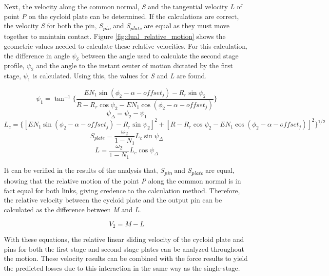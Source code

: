 Next, the velocity along the common normal, \textit{S} and the tangential velocity \textit{L} of point \textit{P} on the cycloid plate can be determined. If the calculations are correct, the velocity \textit{S} for both the pin, \textit{S\textsubscript{pin}} and \textit{S\textsubscript{plate}} are equal as they must move together to maintain contact. Figure \ref{fig:dual_relative_motion} shows the geometric values needed to calculate these relative velocities. For this calculation, the difference in angle $\psi_\delta$ between the angle used to calculate the second stage profile, $\psi_2$ and the angle to the instant center of motion dictated by the first stage, $\psi_1$ is calculated. Using this, the values for \textit{S} and \textit{L} are found. 

\begin{equation}\label{eq:psi_1}
\psi_1 = \tan^{-1}\bigg\{\frac{E N_1 \sin(\phi_2-\alpha-offset_j) - R_r\sin\psi_2}
{R-R_r\cos\psi_2 - E N_1\cos(\phi_2-\alpha-offset_j)}\bigg\}
\end{equation}
\begin{equation} \label{eq:psi_delta}
\psi_{\Delta} = \psi_2 - \psi_1
\end{equation}
\begin{dmath}\label{eq:L_c}
L_{c} = \bigg\{\left[E N_1 \sin(\phi_2-\alpha-offset_j) - R_r\sin\psi_2\right]^2 +
\left[R-R_r\cos\psi_2 - E N_1 \cos(\phi_2-\alpha-offset_j)\right]^{2}\bigg\}^{1/2}
\end{dmath}
\begin{equation}\label{eq:s_plate}
S_{plate} = \frac{\omega_2}{1-N_1} L_c \sin\psi_{\Delta}
\end{equation}
\begin{equation}\label{eq:L}
L = \frac{\omega_2}{1-N_1} L_c \cos\psi_{\Delta}
\end{equation}

It can be verified in the results of the analysis that, \textit{S\textsubscript{pin}} and \textit{S\textsubscript{plate}} are equal, showing that the relative motion of the point \textit{P} along the common normal is in fact equal for both links, giving credence to the calculation method. Therefore, the relative velocity between the cycloid plate and the output pin can be calculated as the difference between \textit{M} and \textit{L}.

\begin{equation}
V_{2} = M - L
\end{equation}

With these equations, the relative linear sliding velocity of the cycloid plate and pins for both the first stage and second stage plates can be analyzed throughout the motion. These velocity results can be combined with the force results to yield the predicted losses due to this interaction in the same way as the single-stage.

